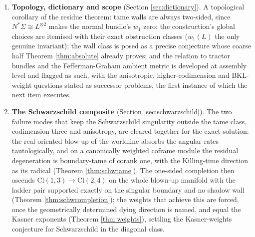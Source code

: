 \documentclass[11pt]{article}
\theoremstyle{definition}
\newcommand{\Cl}{\mathrm{Cl}}
\newcommand{\shL}{L}
\newcommand{\Sig}{\Sigma}
\begin{document}
\begin{enumerate}
\item \textbf{Topology, dictionary and scope} (Section \ref{sec:dictionary}). A topological corollary of the residue theorem: tame walls are always two-sided, since $N^*\Sig \cong \shL^{\otimes 2}$ makes the normal bundle's $w_1$ zero; the construction's global choices are itemised with their exact obstruction classes ($w_1(\shL)$ the only genuine invariant); the wall class is posed as a precise conjecture whose coarse half Theorem \ref{thm:absolute} already proves; and the relation to tractor bundles and the Fefferman-Graham ambient metric is developed at assembly level and flagged as such, with the anisotropic, higher-codimension and BKL-weight questions stated as successor problems, the first instance of which the next item executes.
\item \textbf{The Schwarzschild composite} (Section \ref{sec:schwarzschild}). The two failure modes that keep the Schwarzschild singularity outside the tame class, codimension three and anisotropy, are cleared together for the exact solution: the real oriented blow-up of the worldline absorbs the angular rates tautologically, and on a canonically weighted coframe module the residual degeneration is boundary-tame of corank one, with the Killing-time direction as its radical (Theorem \ref{thm:schwtame}). The one-sided completion then ascends $\Cl(1,3) \to \Cl(2,4)$ on the whole blown-up manifold with the ladder pair supported exactly on the singular boundary and no shadow wall (Theorem \ref{thm:schwcompletion}); the weights that achieve this are forced, once the geometrically determined dying direction is named, and equal the Kasner exponents (Theorem \ref{thm:weights}), settling the Kasner-weights conjecture for Schwarzschild in the diagonal class.

\end{enumerate}
\end{document}
